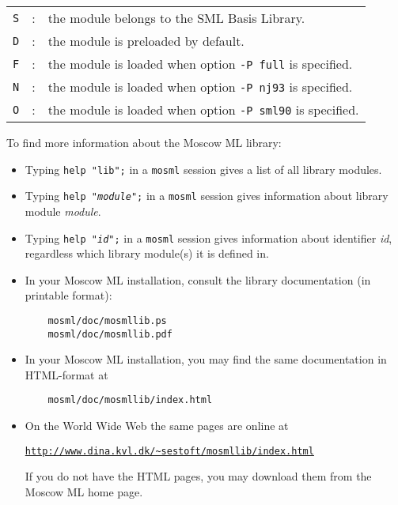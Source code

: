 \documentclass[fleqn,a4paper]{article}
\begin{document}
\begin{center}
\begin{tabular}{lcl}
{\tt S} & : & the module belongs to the SML Basis Library.\\

{\tt D} & : & the module is preloaded by default.\\

{\tt F} & : & the module is loaded when option {\tt -P full}
  is specified.\\

{\tt N} & : &  the module is loaded when option {\tt -P nj93}
  is specified.\\

{\tt O} & : & the module is loaded when option {\tt -P sml90}
  is specified.
\end{tabular}
\end{center}

\noindent To find more information about the Moscow ML library:

\begin{itemize}

\item Typing {\tt help "lib";} in a {\tt mosml} session gives a list of
  all library modules.

\item Typing {\tt help "{\it module\/}";} in a {\tt mosml} session gives
  information about library module {\it module\/}.

\item Typing {\tt help "{\it id\/}";} in a {\tt mosml} session gives
  information about identifier {\it id\/}, regardless which library
  module(s) it is defined in.

\item In your Moscow ML installation, consult the library documentation 
(in printable format):
\begin{verbatim}
    mosml/doc/mosmllib.ps
    mosml/doc/mosmllib.pdf
\end{verbatim}

\item In your Moscow ML installation, you may find the same documentation
  in HTML-format at 

\begin{verbatim}
    mosml/doc/mosmllib/index.html
\end{verbatim}

\item On the World Wide Web the same pages are online at
\begin{alltt}
    \url{http://www.dina.kvl.dk/~sestoft/mosmllib/index.html}    
\end{alltt}
  
  If you do not have the HTML pages, you may download them from the
  Moscow ML home page.
\end{itemize}
\end{document}
